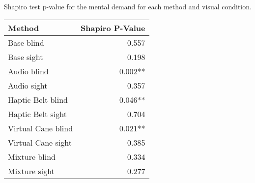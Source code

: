 
\centering
\caption{Shapiro test p-value for the mental demand for each method and visual condition.}
\label{tab:shapiro_mental_demand}
\begin{tabular}{lr}
\toprule
            Method & Shapiro P-Value \\
\midrule
        Base blind &           0.557 \\
        Base sight &           0.198 \\
       Audio blind &         0.002** \\
       Audio sight &           0.357 \\
 Haptic Belt blind &         0.046** \\
 Haptic Belt sight &           0.704 \\
Virtual Cane blind &         0.021** \\
Virtual Cane sight &           0.385 \\
     Mixture blind &           0.334 \\
     Mixture sight &           0.277 \\
\bottomrule
\end{tabular}
